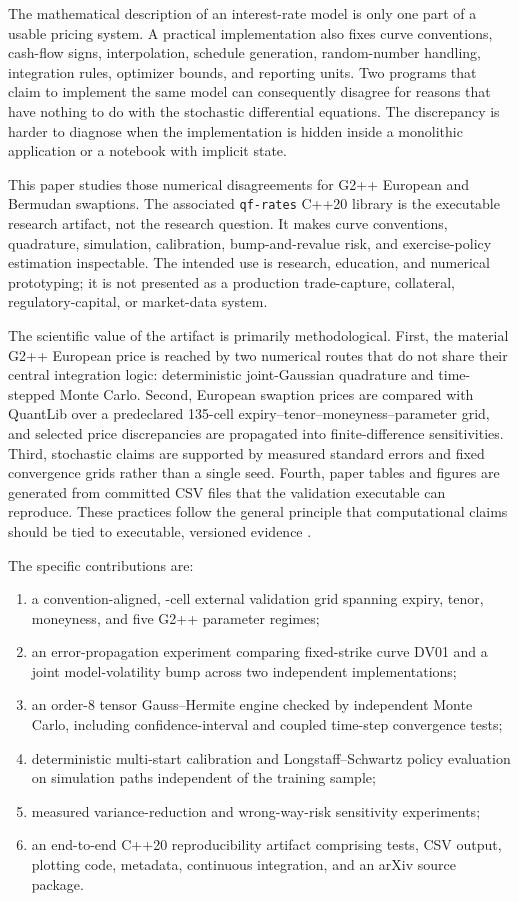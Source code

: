 \documentclass[11pt]{article}
\numberwithin{equation}{section}
\theoremstyle{definition}
\theoremstyle{remark}
\begin{document}
The mathematical description of an interest-rate model is only one part of a
usable pricing system. A practical implementation also fixes curve conventions,
cash-flow signs, interpolation, schedule generation, random-number handling,
integration rules, optimizer bounds, and reporting units. Two programs that claim
to implement the same model can consequently disagree for reasons that have
nothing to do with the stochastic differential equations. The discrepancy is
harder to diagnose when the implementation is hidden inside a monolithic
application or a notebook with implicit state.

This paper studies those numerical disagreements for G2++ European and Bermudan
swaptions. The associated \texttt{qf-rates} C++20 library is the executable
research artifact, not the research question. It makes curve conventions,
quadrature, simulation, calibration, bump-and-revalue risk, and exercise-policy
estimation inspectable. The intended use is research, education, and numerical
prototyping; it is not presented as a production trade-capture, collateral,
regulatory-capital, or market-data system.

The scientific value of the artifact is primarily methodological. First, the
material G2++ European price is reached by two numerical routes that do not share
their central integration logic: deterministic joint-Gaussian quadrature and
time-stepped Monte Carlo. Second, European swaption prices are compared with
QuantLib \citep{quantlib} over a predeclared 135-cell
expiry--tenor--moneyness--parameter grid, and selected price discrepancies are
propagated into finite-difference sensitivities. Third, stochastic claims are supported
by measured standard errors and fixed convergence grids rather than a single
seed. Fourth, paper tables and figures are generated from committed CSV files
that the validation executable can reproduce. These practices follow the
general principle that computational claims should be tied to executable,
versioned evidence \citep{sandve2013}.

The specific contributions are:
\begin{enumerate}
  \item a convention-aligned, \QuantLibGridCells-cell external validation grid
  spanning expiry, tenor, moneyness, and five G2++ parameter regimes;
  \item an error-propagation experiment comparing fixed-strike curve DV01 and a
  joint model-volatility bump across two independent implementations;
  \item an order-8 tensor Gauss--Hermite engine checked by independent Monte
  Carlo, including confidence-interval and coupled time-step convergence tests;
  \item deterministic multi-start calibration and Longstaff--Schwartz policy
  evaluation on simulation paths independent of the training sample;
  \item measured variance-reduction and wrong-way-risk sensitivity experiments;
  \item an end-to-end C++20 reproducibility artifact comprising tests, CSV
  output, plotting code, metadata, continuous integration, and an arXiv source
  package.
\end{enumerate}
\end{document}
